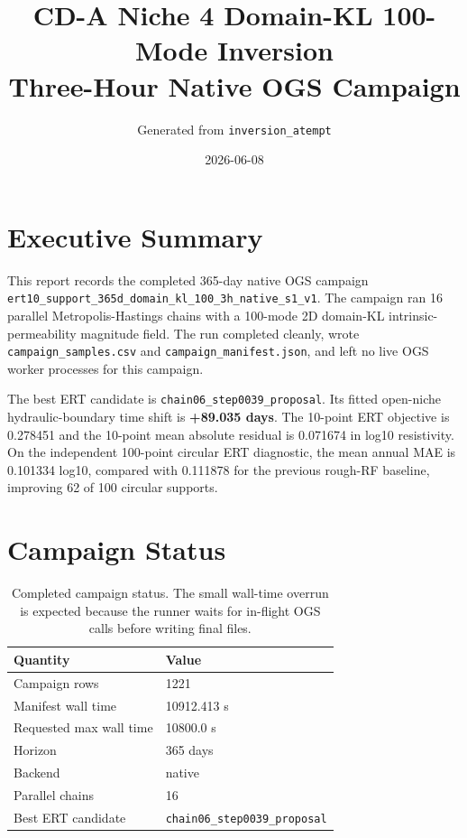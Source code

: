 \documentclass[10pt]{article}
\title{CD-A Niche 4 Domain-KL 100-Mode Inversion\\Three-Hour Native OGS Campaign}
\author{Generated from \texttt{inversion\_atempt}}
\date{2026-06-08}
\begin{document}
\maketitle

\section*{Executive Summary}

This report records the completed 365-day native OGS campaign
\texttt{ert10\_support\_365d\_domain\_kl\_100\_3h\_native\_s1\_v1}. The
campaign ran 16 parallel Metropolis-Hastings chains with a 100-mode 2D
domain-KL intrinsic-permeability magnitude field. The run completed cleanly,
wrote \texttt{campaign\_samples.csv} and \texttt{campaign\_manifest.json}, and
left no live OGS worker processes for this campaign.

The best ERT candidate is \texttt{chain06\_step0039\_proposal}. Its fitted
open-niche hydraulic-boundary time shift is \textbf{+89.035 days}. The 10-point
ERT objective is 0.278451 and the 10-point mean absolute residual is 0.071674
in log10 resistivity. On the independent 100-point circular ERT diagnostic, the
mean annual MAE is 0.101334 log10, compared with 0.111878 for the previous
rough-RF baseline, improving 62 of 100 circular supports.

\section{Campaign Status}

\begin{table}[H]
\centering
\begin{tabular}{ll}
\toprule
Quantity & Value \\
\midrule
Campaign rows & 1221 \\
Manifest wall time & 10912.413 s \\
Requested max wall time & 10800.0 s \\
Horizon & 365 days \\
Backend & native \\
Parallel chains & 16 \\
Best ERT candidate & \texttt{chain06\_step0039\_proposal} \\
\bottomrule
\end{tabular}
\caption{Completed campaign status. The small wall-time overrun is expected because the runner waits for in-flight OGS calls before writing final files.}
\end{table}
\end{document}
